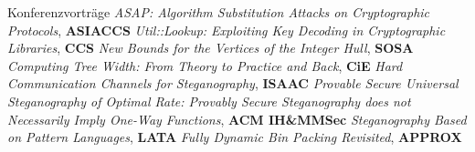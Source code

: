 \begin{rubric}{Konferenzvorträge}
  \entry*[2022] \emph{ASAP: Algorithm Substitution Attacks on Cryptographic Protocols}, \textbf{ASIACCS}
\entry*[2021] \emph{Util::Lookup: Exploiting Key Decoding in Cryptographic Libraries}, \textbf{CCS}
\entry*[2021] \emph{New Bounds for the Vertices of the Integer Hull}, \textbf{SOSA}
\entry*[2018] \emph{Computing Tree Width: From Theory to Practice and Back}, \textbf{CiE}
\entry*[2017] \emph{Hard Communication Channels for Steganography}, \textbf{ISAAC}
\entry*[2016] \emph{Provable Secure Universal Steganography of Optimal Rate: Provably Secure Steganography does not Necessarily Imply One-Way Functions}, \textbf{ACM IH\&MMSec}
\entry*[2016] \emph{Steganography Based on Pattern Languages}, \textbf{LATA}
\entry*[2015] \emph{Fully Dynamic Bin Packing Revisited}, \textbf{APPROX}
\end{rubric}